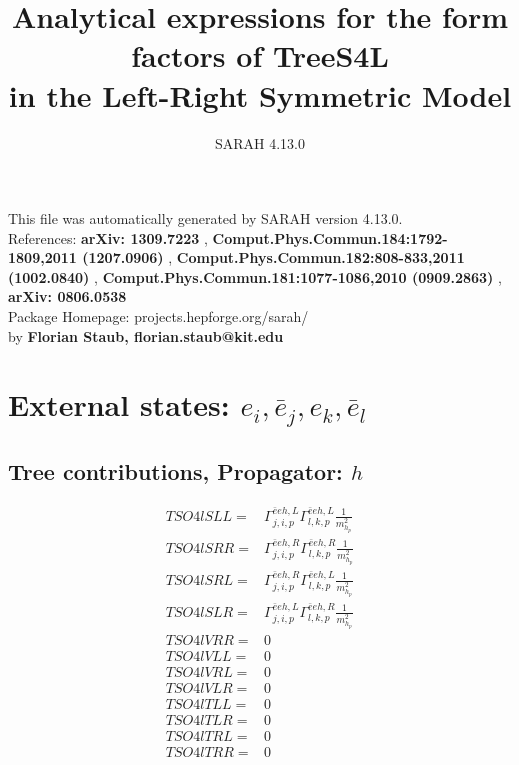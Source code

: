 \documentclass[A4,landscape]{article}
\begin{document}
\title{Analytical expressions for the form factors of TreeS4L\\ in the Left-Right Symmetric Model } 
 \author{SARAH 4.13.0} 
 \maketitle 
 \vspace{10cm} 
This file was automatically generated by SARAH version 4.13.0.  \\ 
References: {\bf arXiv: 1309.7223 }, {\bf Comput.Phys.Commun.184:1792-1809,2011 (1207.0906) }, {\bf Comput.Phys.Commun.182:808-833,2011 (1002.0840) }, {\bf Comput.Phys.Commun.181:1077-1086,2010 (0909.2863) }, {\bf arXiv: 0806.0538 } \\ 
Package Homepage: projects.hepforge.org/sarah/ \\ 
by {\bf Florian Staub, florian.staub@kit.edu} 
 \pagebreak 
 \tableofcontents 
 \pagebreak 
\section{External states: ${e_{{i}}, \bar{e}_{{j}}, e_{{k}}, \bar{e}_{{l}}}$} 
\subsection{Tree contributions, Propagator: $h$} 

\begin{align} 
  TSO4lSLL= & \Gamma^{\bar{e}e h ,L}_{j, i, p} \Gamma^{\bar{e}e h ,L}_{l, k, p} \frac{1}{m^2_{h_{{p}}}} \\ 
  TSO4lSRR= & \Gamma^{\bar{e}e h ,R}_{j, i, p} \Gamma^{\bar{e}e h ,R}_{l, k, p} \frac{1}{m^2_{h_{{p}}}} \\ 
  TSO4lSRL= & \Gamma^{\bar{e}e h ,R}_{j, i, p} \Gamma^{\bar{e}e h ,L}_{l, k, p} \frac{1}{m^2_{h_{{p}}}} \\ 
  TSO4lSLR= & \Gamma^{\bar{e}e h ,L}_{j, i, p} \Gamma^{\bar{e}e h ,R}_{l, k, p} \frac{1}{m^2_{h_{{p}}}} \\ 
  TSO4lVRR= & 0 \\ 
  TSO4lVLL= & 0 \\ 
  TSO4lVRL= & 0 \\ 
  TSO4lVLR= & 0 \\ 
  TSO4lTLL= & 0 \\ 
  TSO4lTLR= & 0 \\ 
  TSO4lTRL= & 0 \\ 
  TSO4lTRR= & 0 \\ 
\end{align} 
\end{document}
